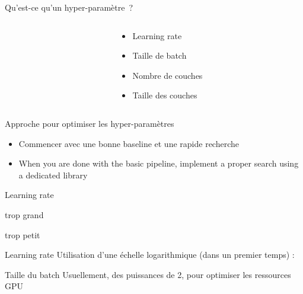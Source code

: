 \begin{frame}{Qu'est-ce qu'un hyper-paramètre~?}
  \begin{columns}
    \begin{column}[c]{0.5\textwidth}
    \end{column}
    \begin{column}[c]{0.5\textwidth}
      \begin{itemize}
        \item Learning rate
        \item Taille de batch
        \item Nombre de couches
        \item Taille des couches
      \end{itemize}
    \end{column}
  \end{columns}
\end{frame}

\begin{frame}{Approche pour optimiser les hyper-paramètres}
  \begin{itemize}[<+->]
    \item Commencer avec une bonne baseline et une rapide recherche 
    \item When you are done with the basic pipeline, implement a proper search using a dedicated library
  \end{itemize}
\end{frame}

\begin{frame}{Learning rate}
  \begin{minipage}{0.49\textwidth}
    \centering
    trop grand
  \end{minipage}\hfill
  \begin{minipage}{0.49\linewidth}
    \centering
    trop petit
  \end{minipage}\hfill

\end{frame}

\begin{frame}{Learning rate}
  Utilisation d'une échelle logarithmique (dans un premier temps) :
\end{frame}

\begin{frame}{Taille du batch}
  Usuellement, des puissances de 2, pour optimiser les ressources GPU
\end{frame}

